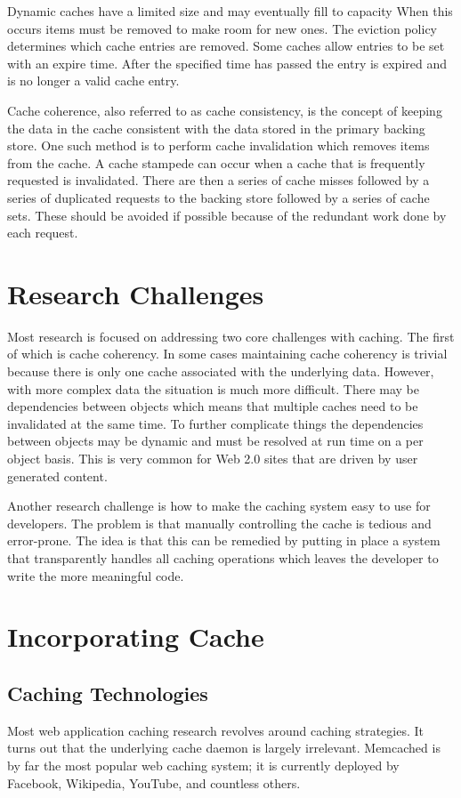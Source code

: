 \documentclass[12pt]{ucthesis}
\begin{document}
Dynamic caches have a limited size and may eventually fill to capacity
When this occurs items must be removed to make room for new ones.
The eviction policy determines which cache entries are removed.
Some caches allow entries to be set with an expire time.
After the specified time has passed the entry is expired and is no longer a valid cache entry.

Cache coherence, also referred to as cache consistency, is the concept of keeping the data in the cache consistent with the data stored in the primary backing store.
One such method is to perform cache invalidation which removes items from the cache.
A cache stampede can occur when a cache that is frequently requested is invalidated.
There are then a series of cache misses followed by a series of duplicated requests to the backing store followed by a series of cache sets.
These should be avoided if possible because of the redundant work done by each request.

\section{Research Challenges}
Most research is focused on addressing two core challenges with caching.
The first of which is cache coherency.
In some cases maintaining cache coherency is trivial because there is only one cache associated with the underlying data.
However, with more complex data the situation is much more difficult.
There may be dependencies between objects which means that multiple caches need to be invalidated at the same time.
To further complicate things the dependencies between objects may be dynamic and must be resolved at run time on a per object basis.
This is very common for Web 2.0 sites that are driven by user generated content.

Another research challenge is how to make the caching system easy to use for developers.
The problem is that manually controlling the cache is tedious and error-prone.
The idea is that this can be remedied by putting in place a system that transparently handles all caching operations which leaves the developer to write the more meaningful code.

\section{Incorporating Cache}
\subsection{Caching Technologies}
Most web application caching research revolves around caching strategies.
It turns out that the underlying cache daemon is largely irrelevant.
Memcached is by far the most popular web caching system; it is currently deployed by Facebook, Wikipedia, YouTube, and countless others.\cite{memcachedDotOrg}
\end{document}
